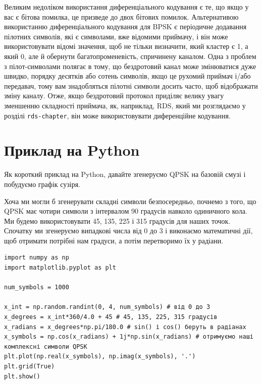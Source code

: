 \href{../_images/differential_coding.svg}{}

Великим недоліком використання диференціального кодування є те, що якщо
у вас є бітова помилка, це призведе до двох бітових помилок.
Альтернативою використанню диференціального кодування для BPSK є
періодичне додавання пілотних символів, які є символами, вже відомими
приймачу, і він може використовувати відомі значення, щоб не тільки
визначити, який кластер є 1, а який 0, але й обернути
багатопроменевість, спричинену каналом. Одна з проблем з пілот-символами
полягає в тому, що бездротовий канал може змінюватися дуже швидко,
порядку десятків або сотень символів, якщо це рухомий приймач і/або
передавач, тому вам знадобляться пілотні символи досить часто, щоб
відображати зміну каналу. Отже, якщо бездротовий протокол приділяє
велику увагу зменшенню складності приймача, як, наприклад, RDS, який ми
розглядаємо у розділі \texttt{rds-chapter}, він може використовувати
диференційне кодування.

\section{Приклад на
Python}\label{ux43fux440ux438ux43aux43bux430ux434-ux43dux430-python}

Як короткий приклад на Python, давайте згенеруємо QPSK на базовій смузі
і побудуємо графік сузір\textquotesingle я.

Хоча ми могли б згенерувати складні символи безпосередньо, почнемо з
того, що QPSK має чотири символи з інтервалом 90 градусів навколо
одиничного кола. Ми будемо використовувати 45, 135, 225 і 315 градусів
для наших точок. Спочатку ми згенеруємо випадкові числа від 0 до 3 і
виконаємо математичні дії, щоб отримати потрібні нам градуси, а потім
перетворимо їх у радіани.

\begin{Verbatim}[breaklines=true,breakanywhere=true,fontsize=\small]
import numpy as np
import matplotlib.pyplot as plt

num_symbols = 1000

x_int = np.random.randint(0, 4, num_symbols) # від 0 до 3
x_degrees = x_int*360/4.0 + 45 # 45, 135, 225, 315 градусів
x_radians = x_degrees*np.pi/180.0 # sin() і cos() беруть в радіанах
x_symbols = np.cos(x_radians) + 1j*np.sin(x_radians) # отримуємо наші комплексні символи QPSK
plt.plot(np.real(x_symbols), np.imag(x_symbols), '.')
plt.grid(True)
plt.show()
\end{Verbatim}


